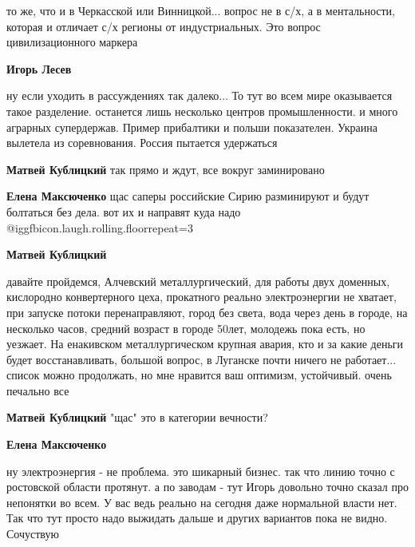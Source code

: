 \begin{itemize}
\begin{itemize}

то же, что и в Черкасской или Винницкой... вопрос не в с/х, а в ментальности,
которая и отличает с/х регионы от индустриальных. Это вопрос цивилизационного
маркера

\textbf{Игорь Лесев} 

ну если уходить в рассуждениях так далеко... То тут во всем мире оказывается
такое разделение. останется лишь несколько центров промышленности. и много
аграрных супердержав. Пример прибалтики и польши показателен. Украина вылетела
из соревнования. Россия пытается удержаться


\textbf{Матвей Кублицкий} так прямо и ждут, все вокруг заминировано

\textbf{Елена Максюченко} щас саперы российские Сирию разминируют и будут болтаться без дела. вот их и направят куда надо @igg{fbicon.laugh.rolling.floor}{repeat=3} 


\textbf{Матвей Кублицкий} 

давайте пройдемся, Алчевский металлургический, для работы двух доменных,
кислородно конвертерного цеха, прокатного реально электроэнергии не хватает,
при запуске потоки перенаправляют, город без света, вода через день в городе,
на несколько часов, средний возраст в городе 50лет, молодежь пока есть, но
уезжает. На енакивском металлургическом крупная авария, кто и за какие деньги
будет восстанавливать, большой вопрос, в Луганске почти ничего не
работает... список можно продолжать, но мне нравится ваш оптимизм, устойчивый.
очень печально все

\textbf{Матвей Кублицкий} "щас" это в категории вечности?

\textbf{Елена Максюченко} 

ну электроэнергия - не проблема. это шикарный бизнес. так что линию точно с
ростовской области протянут. а по заводам - тут Игорь довольно точно сказал про
непонятки во всем. У вас ведь реально на сегодня даже нормальной власти нет.
Так что тут просто надо выжидать дальше и других вариантов пока не видно.
Сочуствую



\end{itemize}
\end{itemize}
